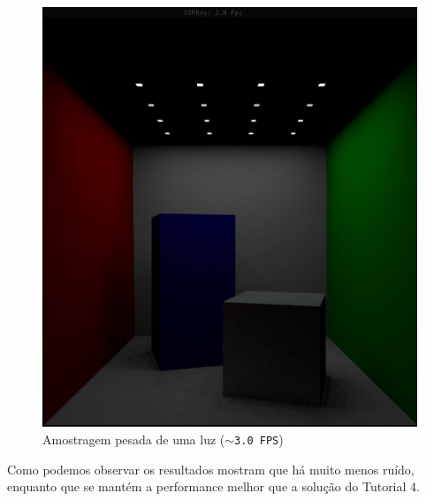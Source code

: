 \documentclass[a4paper]{report}
\begin{document}
\begin{figure}[H]
    \centering
    \includegraphics[height=8.cm]{images/test_3.png}
    \caption{Amostragem pesada de uma luz (\texttt{$\sim$3.0 FPS})}
\end{figure}

Como podemos observar os resultados mostram que há muito menos ruído, enquanto
que se mantém a performance melhor que a solução do Tutorial 4.
\end{document}
